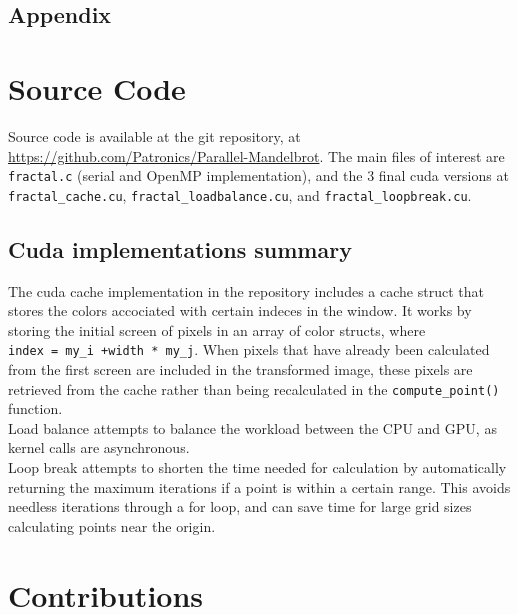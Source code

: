 \documentclass{article}
\begin{document}
\pagebreak

\begin{center}

\section*{Appendix}

\end{center}

\appendix

\section{Source Code}

Source code is available at the git repository, at \url{https://github.com/Patronics/Parallel-Mandelbrot}. The main files of interest are \verb|fractal.c| (serial and OpenMP implementation), and the 3 final cuda versions at \verb|fractal_cache.cu|, \verb|fractal_loadbalance.cu|, and \verb|fractal_loopbreak.cu|.

\subsection{Cuda implementations summary}

The cuda cache implementation in the repository includes a cache struct that stores the colors accociated with certain indeces in the window. It works by storing the initial screen of pixels in an array of color structs, where\\ \verb|index = my_i +width * my_j|.  When pixels that have already been calculated from the first screen are included in the transformed image, these pixels are retrieved from the cache rather than being recalculated in the \verb|compute_point()| function.\\

Load balance attempts to balance the workload between the CPU and GPU, as kernel calls are asynchronous.\\

Loop break attempts to shorten the time needed for calculation by automatically returning the maximum iterations if a point is within a certain range. This avoids needless iterations through a for loop, and can save time for large grid sizes calculating points near the origin.

\section{Contributions}
\end{document}
